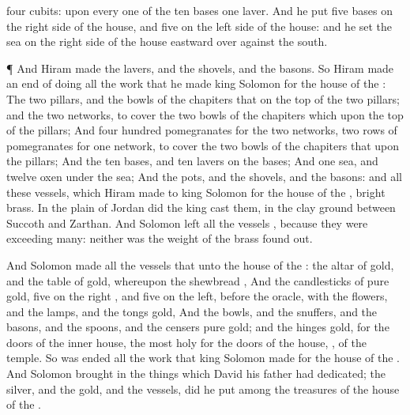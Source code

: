 {four
cubits:
{} upon every
one of the
ten
bases
one
laver.
And he
put
five
bases on the
right
side of the
house, and
five on the
left
side of the
house: and he
set the
sea on the
right
side of the
house
eastward over
against the
south.
\par }{\PP {}¶ And
Hiram
made the
lavers, and the
shovels, and the
basons. So
Hiram
made an end of
doing all the
work that he
made
king
Solomon for the
house of the
{}:
The
two
pillars, and the
{}
bowls of the
chapiters that
{} on the
top of the
two
pillars; and the
two
networks, to
cover the
two
bowls of the
chapiters which
{} upon the
top of the
pillars;
And
four
hundred
pomegranates for the
two
networks,
{}
two
rows of
pomegranates for
one
network, to
cover the
two
bowls of the
chapiters that
{}
upon the
pillars;
And the
ten
bases, and
ten
lavers on the
bases;
And
one
sea, and
twelve
oxen under the
sea;
And the
pots, and the
shovels, and the
basons: and all these
vessels, which
Hiram
made to
king
Solomon for the
house of the
{},
{}
bright
brass.
In the
plain of
Jordan did the
king
cast them, in the
clay
ground between
Succoth and
Zarthan.
And
Solomon
left all the
vessels
{}, because they were
exceeding
many: neither was the
weight of the
brass found
out.
\par }{\PP {}And
Solomon
made all the
vessels that
{} unto the
house of the
{}: the
altar of
gold, and the
table of
gold, whereupon the
shewbread
{},
And the
candlesticks of
pure
gold,
five on the
right
{}, and
five on the
left,
before the
oracle, with the
flowers, and the
lamps, and the
tongs
{}
gold,
And the
bowls, and the
snuffers, and the
basons, and the
spoons, and the
censers
{}
pure
gold; and the
hinges
{}
gold,
{} for the
doors of the
inner
house, the
most
holy
{} for the
doors of the
house,
{}, of the
temple.
So was
ended all the
work that
king
Solomon
made for the
house of the
{}. And
Solomon brought
in the things which
David his
father had
dedicated;
{} the
silver, and the
gold, and the
vessels, did he
put among the
treasures of the
house of the
{}.

}
